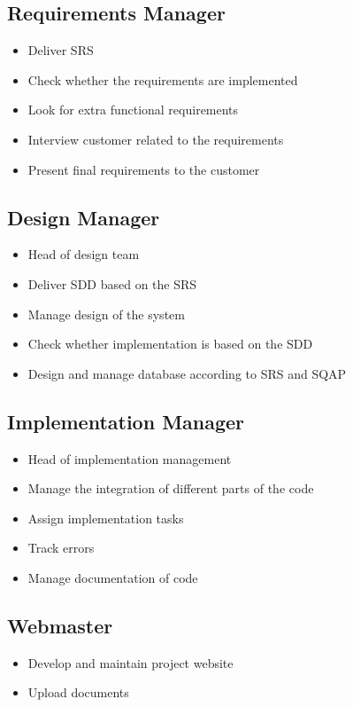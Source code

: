 \documentclass[salesmen, twoside]{../../../templates/latex/2009/softproj}
\begin{document}
\begin{projdoc}
		\subsection{Requirements Manager}
			\begin{itemize}
				\item Deliver SRS
				\item Check whether the requirements are implemented
				\item Look for extra functional requirements
				\item Interview customer related to the requirements
				\item Present final requirements to the customer
			\end{itemize}
			
		\subsection{Design Manager}	
			\begin{itemize}
				\item Head of design team
				\item Deliver SDD based on the SRS
				\item Manage design of the system
				\item Check whether implementation is based on the SDD
				\item Design and manage database according to SRS and SQAP
			\end{itemize}	
			
		\subsection{Implementation Manager}
			\begin{itemize}
				\item Head of implementation management
				\item Manage the integration of different parts of the code
				\item Assign implementation tasks
				\item Track errors	
				\item Manage documentation of code
			\end{itemize}
			
		\subsection{Webmaster}
			\begin{itemize}
				\item Develop and maintain project website
				\item Upload documents
			\end{itemize}	
		

\end{projdoc}
\end{document}
